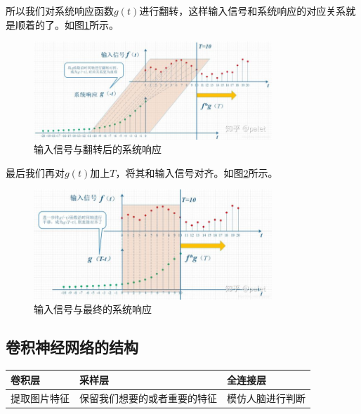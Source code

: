 \documentclass[UTF8]{ctexart}
\begin{document}
\par 所以我们对系统响应函数$g(t)$进行翻转，这样输入信号和系统响应的对应关系就是顺着的了。如图\ref{signal3}所示。
\begin{figure}[htb]
	\centering
	\includegraphics[width=0.80\textwidth]{figures/signal3.jpg}
	\caption{输入信号与翻转后的系统响应}
	\label{signal3}
\end{figure}
\par 最后我们再对$g(t)$加上$T$，将其和输入信号对齐。如图\ref{signal4}所示。
\begin{figure}[htb]
	\centering
	\includegraphics[width=0.80\textwidth]{figures/signal4.jpg}
	\caption{输入信号与最终的系统响应}
	\label{signal4}
\end{figure}

\subsection{卷积神经网络的结构}
\begin{table}[h!]
	\begin{tabular}{|p{100pt}|p{100pt}|p{100pt}|}
		\hline
		卷积层 & 采样层 & 全连接层 \\
		\hline
		提取图片特征 & 保留我们想要的或者重要的特征 & 模仿人脑进行判断 \\
		\hline
	\end{tabular}
\end{table}
\end{document}
